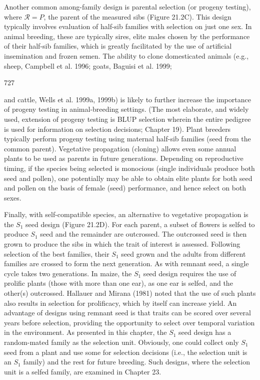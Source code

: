 \documentclass{article}
\begin{document}
Another common among-family design is parental selection (or progeny testing), where  $ \mathcal{R} = P $, the parent of the measured sibs (Figure 21.2C). This design typically involves evaluation of half-sib families with selection on just one sex. In animal breeding, these are typically sires, elite males chosen by the performance of their half-sib families, which is greatly facilitated by the use of artificial insemination and frozen semen. The ability to clone domesticated animals (e.g., sheep, Campbell et al. 1996; goats, Baguisi et al. 1999;

727

and cattle, Wells et al. 1999a, 1999b) is likely to further increase the importance of progeny testing in animal-breeding settings. (The most elaborate, and widely used, extension of progeny testing is BLUP selection wherein the entire pedigree is used for information on selection decisions; Chapter 19). Plant breeders typically perform progeny testing using maternal half-sib families (seed from the common parent). Vegetative propagation (cloning) allows even some annual plants to be used as parents in future generations. Depending on reproductive timing, if the species being selected is monocious (single individuals produce both seed and pollen), one potentially may be able to obtain elite plants for both seed and pollen on the basis of female (seed) performance, and hence select on both sexes.

Finally, with self-compatible species, an alternative to vegetative propagation is the  $ S_{1} $ seed design (Figure 21.2D). For each parent, a subset of flowers is selfed to produce  $ S_{1} $ seed and the remainder are outcrossed. The outcrossed seed is then grown to produce the sibs in which the trait of interest is assessed. Following selection of the best families, their  $ S_{1} $ seed grown and the adults from different families are crossed to form the next generation. As with remnant seed, a single cycle takes two generations. In maize, the  $ S_{1} $ seed design requires the use of prolific plants (those with more than one ear), as one ear is selfed, and the other(s) outcrossed. Hallauer and Mirana (1981) noted that the use of such plants also results in selection for prolificacy, which by itself can increase yield. An advantage of designs using remnant seed is that traits can be scored over several years before selection, providing the opportunity to select over temporal variation in the environment. As presented in this chapter, the  $ S_{1} $ seed design has a random-mated family as the selection unit. Obviously, one could collect only  $ S_{1} $ seed from a plant and use some for selection decisions (i.e., the selection unit is an  $ S_{1} $ family) and the rest for future breeding. Such designs, where the selection unit is a selfed family, are examined in Chapter 23.
\end{document}
